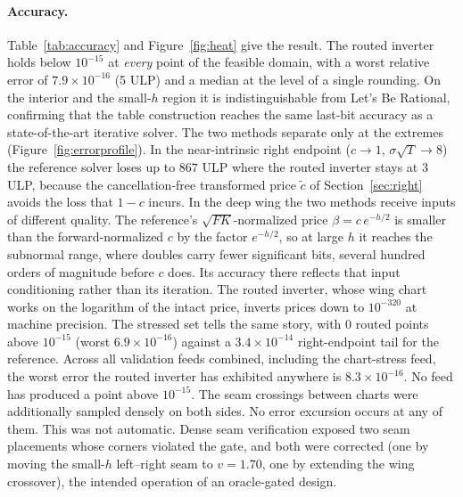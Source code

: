 \documentclass[11pt]{article}
\begin{document}
\paragraph{Accuracy.}
Table~\ref{tab:accuracy} and Figure~\ref{fig:heat} give the result. The routed inverter holds below $10^{-15}$ at \emph{every} point of the feasible domain, with a worst relative error of $7.9\times10^{-16}$ (5 ULP) and a median at the level of a single rounding. On the interior and the small-$h$ region it is indistinguishable from Let's Be Rational, confirming that the table construction reaches the same last-bit accuracy as a state-of-the-art iterative solver. The two methods separate only at the extremes (Figure~\ref{fig:errorprofile}). In the near-intrinsic right endpoint ($c\to1$, $\sigma\sqrt T\to8$) the reference solver loses up to $867$ ULP where the routed inverter stays at $3$ ULP, because the cancellation-free transformed price $\tilde c$ of Section~\ref{sec:right} avoids the loss that $1-c$ incurs. In the deep wing the two methods receive inputs of different quality. The reference's $\sqrt{FK}$-normalized price $\beta=c\,e^{-h/2}$ is smaller than the forward-normalized $c$ by the factor $e^{-h/2}$, so at large $h$ it reaches the subnormal range, where doubles carry fewer significant bits, several hundred orders of magnitude before $c$ does. Its accuracy there reflects that input conditioning rather than its iteration. The routed inverter, whose wing chart works on the logarithm of the intact price, inverts prices down to $10^{-320}$ at machine precision. The stressed set tells the same story, with $0$ routed points above $10^{-15}$ (worst $6.9\times10^{-16}$) against a $3.4\times10^{-14}$ right-endpoint tail for the reference. Across all validation feeds combined, including the chart-stress feed, the worst error the routed inverter has exhibited anywhere is $8.3\times10^{-16}$. No feed has produced a point above $10^{-15}$. The seam crossings between charts were additionally sampled densely on both sides. No error excursion occurs at any of them. This was not automatic. Dense seam verification exposed two seam placements whose corners violated the gate, and both were corrected (one by moving the small-$h$ left--right seam to $v=1.70$, one by extending the wing crossover), the intended operation of an oracle-gated design.
\end{document}
